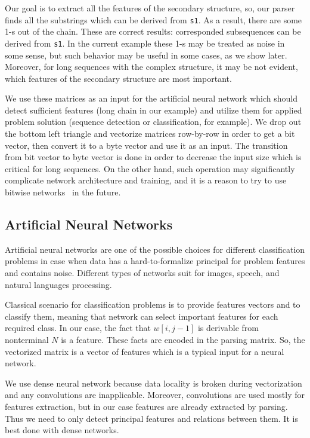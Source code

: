 \documentclass[a4paper,twoside]{article}
\begin{document}
Our goal is to extract all the features of the secondary structure, so, our parser finds all the substrings which can be derived from \verb|s1|.
As a result, there are some 1-s out of the chain.
These are correct results: corresponded subsequences can be derived from \verb|s1|. 
In the current example these 1-s may be treated as noise in some sense, but such behavior may be useful in some cases, as we show later.
Moreover, for long sequences with the complex structure, it may be not evident, which features of the secondary structure are most important.

We use these matrices as an input for the artificial neural network which should detect sufficient features (long chain in our example) and utilize them for applied problem solution (sequence detection or classification, for example).
We drop out the bottom left triangle and vectorize matrices row-by-row in order to get a bit vector, then convert it to a byte vector and use it as an input.
The transition from bit vector to byte vector is done in order to decrease the input size which is critical for long sequences. 
On the other hand, such operation may significantly complicate network architecture and training, and it is a reason to try to use bitwise networks~\cite{DBLP:journals:corr:KimS16} in the future.  

\subsection{Artificial Neural Networks}

\noindent Artificial neural networks are one of the possible choices for different classification problems in case when data has a hard-to-formalize principal for problem features and contains noise.
Different types of networks suit for images, speech, and natural languages processing.

Classical scenario for classification problems is to provide features vectors and to classify them, meaning that network can select important features for each required class.
In our case, the fact that $w[i,j-1]$ is derivable from nonterminal $N$ is a feature.
These facts are encoded in the parsing matrix.
So, the vectorized matrix is a vector of features which is a typical input for a neural network.

We use dense neural network because data locality is broken during vectorization and any convolutions are inapplicable.
Moreover, convolutions are used mostly for features extraction, but in our case features are already extracted by parsing.
Thus we need to only detect principal features and relations between them.
It is best done with dense networks.
\end{document}
